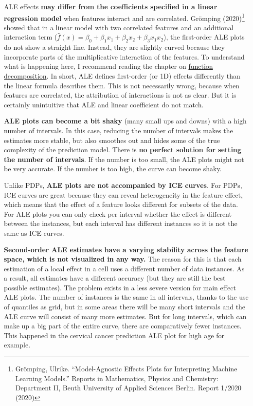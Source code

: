 \documentclass[
  11pt,
]{scrbook}
\begin{document}
ALE effects \textbf{may differ from the coefficients specified in a linear regression model} when features interact and are correlated.
Grömping (2020)\footnote{Grömping, Ulrike. ``Model-Agnostic Effects Plots for Interpreting Machine Learning Models.'' Reports in Mathematics, Physics and Chemistry: Department II, Beuth University of Applied Sciences Berlin. Report 1/2020 (2020)} showed that in a linear model with two correlated features and an additional interaction term (\(\hat{f}(x) = \beta_0 + \beta_1 x_1 + \beta_2 x_2 + \beta_3 x_1 x_2\)), the first-order ALE plots do not show a straight line.
Instead, they are slightly curved because they incorporate parts of the multiplicative interaction of the features.
To understand what is happening here, I recommend reading the chapter on \protect\hyperlink{decomposition}{function decomposition}.
In short, ALE defines first-order (or 1D) effects differently than the linear formula describes them.
This is not necessarily wrong, because when features are correlated, the attribution of interactions is not as clear.
But it is certainly unintuitive that ALE and linear coefficient do not match.

\textbf{ALE plots can become a bit shaky} (many small ups and downs) with a high number of intervals.
In this case, reducing the number of intervals makes the estimates more stable, but also smoothes out and hides some of the true complexity of the prediction model.
There is \textbf{no perfect solution for setting the number of intervals}.
If the number is too small, the ALE plots might not be very accurate.
If the number is too high, the curve can become shaky.

Unlike PDPs, \textbf{ALE plots are not accompanied by ICE curves}.
For PDPs, ICE curves are great because they can reveal heterogeneity in the feature effect, which means that the effect of a feature looks different for subsets of the data.
For ALE plots you can only check per interval whether the effect is different between the instances, but each interval has different instances so it is not the same as ICE curves.

\textbf{Second-order ALE estimates have a varying stability across the feature space, which is not visualized in any way.}
The reason for this is that each estimation of a local effect in a cell uses a different number of data instances.
As a result, all estimates have a different accuracy (but they are still the best possible estimates).
The problem exists in a less severe version for main effect ALE plots.
The number of instances is the same in all intervals, thanks to the use of quantiles as grid, but in some areas there will be many short intervals and the ALE curve will consist of many more estimates.
But for long intervals, which can make up a big part of the entire curve, there are comparatively fewer instances.
This happened in the cervical cancer prediction ALE plot for high age for example.
\end{document}
